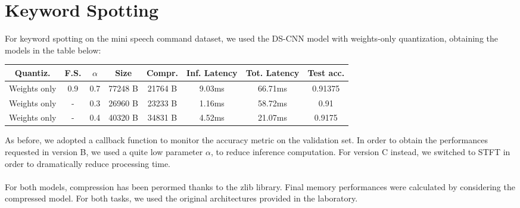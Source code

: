\documentclass{article}
\begin{document}
\vspace{0.1cm}

\section{Keyword Spotting}

For keyword spotting on the mini speech command dataset, we used the DS-CNN model with weights-only quantization, obtaining the models in the table below:
\\
\begin{center}
\begin{tabular}{|c|c|c|c|c|c|c|c|}
\hline
\textbf{Quantiz.} &\textbf{F.S.} & \textbf{$\alpha$} &\textbf{Size} &\textbf{Compr.}&  \textbf{Inf. Latency}& \textbf{Tot. Latency} &\textbf{Test acc.}\\
\hline
Weights only & 0.9 & 0.7 & 77248 B & 21764 B & 9.03ms&   66.71ms & 0.91375 \\ 
Weights only & - &  0.3  & 26960 B & 23233 B  &  1.16ms& 58.72ms & 0.91 \\ 
Weights only & - &  0.4  & 40320 B & 34831 B  & 4.52ms & 21.07ms & 0.9175 \\ 

\hline
\end{tabular}
\end{center}

\vspace{0.5cm}

As before, we adopted a callback function to monitor the accuracy metric on the validation set.
In order to obtain the performances requested in version B, we used a quite low parameter $\alpha$, to reduce inference computation. For version C instead, we switched to STFT in order to dramatically reduce processing time.
\\\\
For both models, compression has been perormed thanks to the zlib library. Final memory performances were calculated by considering the compressed model.
For both tasks, we used the original architectures provided in the laboratory.
\end{document}

